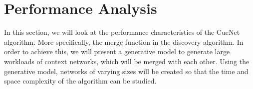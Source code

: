 


\section{Performance Analysis}
In this section, we will look at the performance characteristics of the CueNet algorithm. More specifically, the merge function in the discovery algorithm. In order to achieve this, we will present a generative model to generate large workloads of context networks, which will be merged with each other. Using the generative model, networks of varying sizes will be created so that the time and space complexity of the algorithm can be studied.

